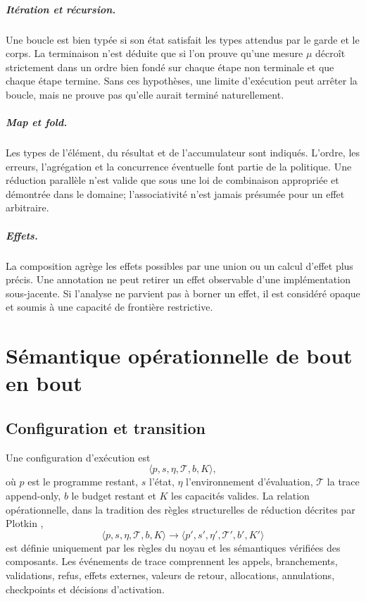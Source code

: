 \documentclass[11pt,a4paper,openany]{book}
\newcommand{\Trace}{\mathcal{T}}
\theoremstyle{definition}
\theoremstyle{plain}
\theoremstyle{remark}
\begin{document}
\paragraph{Itération et récursion.} Une boucle est bien typée si son état satisfait les types attendus par le garde et le corps. La terminaison n'est déduite que si l'on prouve qu'une mesure $\mu$ décroît strictement dans un ordre bien fondé sur chaque étape non terminale et que chaque étape termine. Sans ces hypothèses, une limite d'exécution peut arrêter la boucle, mais ne prouve pas qu'elle aurait terminé naturellement.

\paragraph{Map et fold.} Les types de l'élément, du résultat et de l'accumulateur sont indiqués. L'ordre, les erreurs, l'agrégation et la concurrence éventuelle font partie de la politique. Une réduction parallèle n'est valide que sous une loi de combinaison appropriée et démontrée dans le domaine; l'associativité n'est jamais présumée pour un effet arbitraire.

\paragraph{Effets.} La composition agrège les effets possibles par une union ou un calcul d'effet plus précis. Une annotation ne peut retirer un effet observable d'une implémentation sous-jacente. Si l'analyse ne parvient pas à borner un effet, il est considéré opaque et soumis à une capacité de frontière restrictive.

\chapter{Sémantique opérationnelle de bout en bout}
\section{Configuration et transition}
Une configuration d'exécution est
\[
\langle p,s,\eta,\Trace,b,K\rangle,
\]
où $p$ est le programme restant, $s$ l'état, $\eta$ l'environnement d'évaluation, $\Trace$ la trace append-only, $b$ le budget restant et $K$ les capacités valides. La relation opérationnelle, dans la tradition des règles structurelles de réduction décrites par Plotkin \cite{Plotkin1981},
\[
\langle p,s,\eta,\Trace,b,K\rangle\longrightarrow\langle p',s',\eta',\Trace',b',K'\rangle
\]
est définie uniquement par les règles du noyau et les sémantiques vérifiées des composants. Les événements de trace comprennent les appels, branchements, validations, refus, effets externes, valeurs de retour, allocations, annulations, checkpoints et décisions d'activation.
\end{document}
